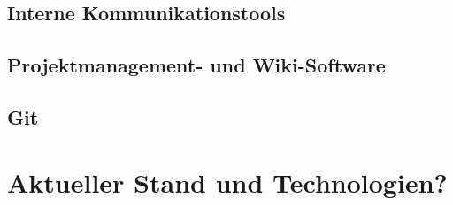 \subsection{Interne Kommunikationstools}

\subsection{Projektmanagement- und Wiki-Software}

\subsection{Git}

\section{Aktueller Stand und Technologien?}